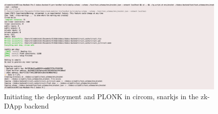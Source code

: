 \begin{figure}[hbt]
	\centering
		\includegraphics[width=1.0\textwidth]{Pictures/second-cmd.png}
	\caption{Initiating the deployment and PLONK in circom, snarkjs in the zk-DApp backend}
	\label{fig:second-cmd}
\end{figure}

